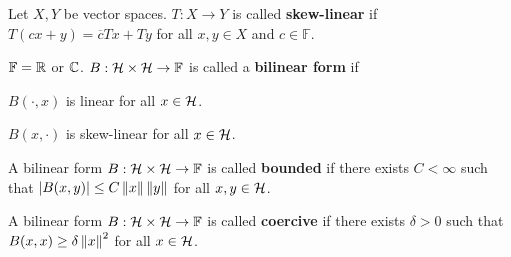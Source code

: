 \begin{definition}
    Let $X,Y$ be vector spaces. $T:X\to Y$ is called \textbf{skew-linear} if 
    $T(cx + y) = \overline{c}Tx + Ty$ for all $x,y\in X$ and $c\in\mathbb{F}$.
\end{definition}

\begin{definition}
    $\mathbb{F} = \mathbb{R}$ or $\mathbb{C}$. $B:\mathcal{H}\times\mathcal{H}\to\mathbb{F}$ is called a 
    \textbf{bilinear form} if 
    \begin{thmenum}
        \item $B(\cdot,x)$ is linear for all $x\in\mathcal{H}$. 
        \item $B(x,\cdot)$ is skew-linear for all $x\in\mathcal{H}$.
    \end{thmenum}
\end{definition}

\begin{definition}
    A bilinear form $B:\mathcal{H}\times\mathcal{H}\to\mathbb{F}$ is called \textbf{bounded} if 
    there exists $C<\infty$ such that $\left\lvert {B(x,y)} \right\rvert\leq C\left\lVert {x} \right\rVert\left\lVert {y} \right\rVert$ for 
    all $x,y\in\mathcal{H}$.
\end{definition}

\begin{definition}
    A bilinear form $B:\mathcal{H}\times\mathcal{H}\to\mathbb{F}$ is called \textbf{coercive} if 
    there exists $\delta>0$ such that $B(x,x)\geq \delta\left\lVert {x} \right\rVert^2$ for all 
    $x\in\mathcal{H}$.
\end{definition}

